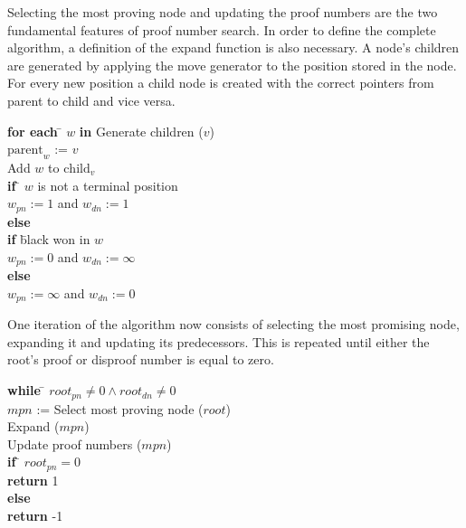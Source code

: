 \documentclass[a4paper, 11pt]{article}
\begin{document}
Selecting the most proving node and updating the proof numbers are the two fundamental features of proof number search. In order to
define the complete algorithm, a definition of the expand function is also necessary. A node's children are generated by applying the move generator
to the position stored in the node. For every new position a child node is created with the correct pointers from parent to child
and vice versa.

\begin{minipage}{\textwidth}
\vspace{4mm}
\begin{algorithm}[Expand ($v$)]
\hfill\par
\begin{tabbing}
  \textbf{for each} \= $w$ \textbf{in} Generate children ($v$)\\
  \> $\text{parent}_w$ := $v$\\
  \> Add $w$ to $\text{child}_v$\\
  \> \textbf{if} \= $w$ is not a terminal position\\
  \> \> $w_{pn} := 1$ and $w_{dn} := 1$\\
  \> \textbf{else}\\
  \> \> \textbf{if} \= black won in $w$\\
  \> \> \> $w_{pn} := 0$ and $w_{dn} := \infty$\\
  \> \> \textbf{else}\\
  \> \> \> $w_{pn} := \infty$ and $w_{dn} := 0$\\
\end{tabbing}
\end{algorithm}
\vspace{4mm}
\end{minipage}

One iteration of the algorithm now consists of selecting the most promising node, expanding it and updating its predecessors.
This is repeated until either the root's proof or disproof number is equal to zero.

\begin{minipage}{\textwidth}
\vspace{4mm}
\begin{algorithm}
\hfill\par
\begin{tabbing}
  \textbf{while} \= $root_{pn} \not= 0 \land root_{dn} \not= 0$\\
  \> $mpn$ := Select most proving node ($root$) \\
  \> Expand ($mpn$)\\
  \> Update proof numbers ($mpn$)\\
  \textbf{if} \= $root_{pn} = 0$\\
  \> \textbf{return} 1\\
  \textbf{else}\\
  \> \textbf{return} -1\\
\end{tabbing}
\end{algorithm}
\vspace{4mm}
\end{minipage}
\end{document}
